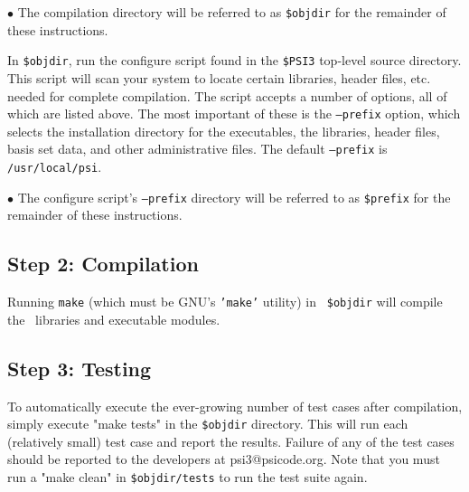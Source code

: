 \documentclass[12pt]{article}
\begin{document}
$\bullet$ The compilation directory will be referred to as {\tt \$objdir}
for the remainder of these instructions.

In {\tt \$objdir}, run the configure script found in the {\tt \$PSI3}
top-level source directory.  This script will scan your system to locate
certain libraries, header files, etc. needed for complete compilation.
The script accepts a number of options, all of which are listed above.
The most important of these is the {\tt --prefix} option, which selects the
installation directory for the executables, the libraries, header files,
basis set data, and other administrative files.  The default {\tt --prefix}
is {\tt /usr/local/psi}.

$\bullet$ The configure script's {\tt --prefix} directory will be referred
to as {\tt \$prefix} for the remainder of these instructions.

\subsection{Step 2: Compilation}

Running {\tt make} (which must be GNU's {\tt 'make'} utility) in {\tt
\$objdir} will compile the \PSIthree\ libraries and executable
modules.

\subsection{Step 3: Testing}

To automatically execute the ever-growing number of test cases after
compilation, simply execute "make tests" in the {\tt \$objdir} directory.
This will run each (relatively small) test case and report the results.
Failure of any of the test cases should be reported to the developers at
psi3@psicode.org.  Note that you must run a "make clean" in 
{\tt \$objdir/tests} to run the test suite again.
\end{document}
